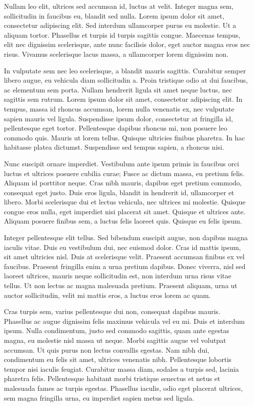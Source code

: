 \documentclass{article}
\begin{document}
Nullam leo elit, ultrices sed accumsan id, luctus at velit. Integer magna sem, sollicitudin in faucibus eu, blandit sed nulla. Lorem ipsum dolor sit amet, consectetur adipiscing elit. Sed interdum ullamcorper purus eu molestie. Ut a aliquam tortor. Phasellus et turpis id turpis sagittis congue. Maecenas tempus, elit nec dignissim scelerisque, ante nunc facilisis dolor, eget auctor magna eros nec risus. Vivamus scelerisque lacus massa, a ullamcorper lorem dignissim non.


In vulputate sem nec leo scelerisque, a blandit mauris sagittis. Curabitur semper libero augue, eu vehicula diam sollicitudin a. Proin tristique odio at dui faucibus, ac elementum sem porta. Nullam hendrerit ligula sit amet neque luctus, nec sagittis sem rutrum. Lorem ipsum dolor sit amet, consectetur adipiscing elit. In tempus, massa id rhoncus accumsan, lorem nulla venenatis ex, nec vulputate sapien mauris vel ligula. Suspendisse ipsum dolor, consectetur at fringilla id, pellentesque eget tortor. Pellentesque dapibus rhoncus mi, non posuere leo commodo quis. Mauris ut lorem tellus. Quisque ultricies finibus pharetra. In hac habitasse platea dictumst. Suspendisse sed tempus sapien, a rhoncus nisi.


Nunc suscipit ornare imperdiet. Vestibulum ante ipsum primis in faucibus orci luctus et ultrices posuere cubilia curae; Fusce ac dictum massa, eu pretium felis. Aliquam id porttitor neque. Cras nibh mauris, dapibus eget pretium commodo, consequat eget justo. Duis eros ligula, blandit in hendrerit id, ullamcorper et libero. Morbi scelerisque dui et lectus vehicula, nec ultrices mi molestie. Quisque congue eros nulla, eget imperdiet nisi placerat sit amet. Quisque et ultrices ante. Aliquam posuere finibus sem, a luctus felis laoreet quis. Quisque eu felis ipsum.


Integer pellentesque elit tellus. Sed bibendum suscipit augue, non dapibus magna iaculis vitae. Duis eu vestibulum dui, nec euismod dolor. Cras id mattis ipsum, sit amet ultricies nisl. Duis at scelerisque velit. Praesent accumsan finibus ex vel faucibus. Praesent fringilla enim a urna pretium dapibus. Donec viverra, nisl sed laoreet ultrices, mauris neque sollicitudin est, non interdum urna risus vitae tellus. Ut non lectus ac magna malesuada pretium. Praesent aliquam, urna ut auctor sollicitudin, velit mi mattis eros, a luctus eros lorem ac quam.


Cras turpis sem, varius pellentesque dui non, consequat dapibus mauris. Phasellus ac augue dignissim felis maximus vehicula vel eu mi. Duis et interdum ipsum. Nulla condimentum, justo sed commodo sagittis, quam ante egestas magna, eu molestie nisl massa ut neque. Morbi sagittis augue vel volutpat accumsan. Ut quis purus non lectus convallis egestas. Nam nibh dui, condimentum eu felis sit amet, ultrices venenatis nibh. Pellentesque lobortis tempor nisi iaculis feugiat. Curabitur massa diam, sodales a turpis sed, lacinia pharetra felis. Pellentesque habitant morbi tristique senectus et netus et malesuada fames ac turpis egestas. Phasellus iaculis, odio eget placerat ultrices, sem magna fringilla urna, eu imperdiet sapien metus sed ligula.
\end{document}
